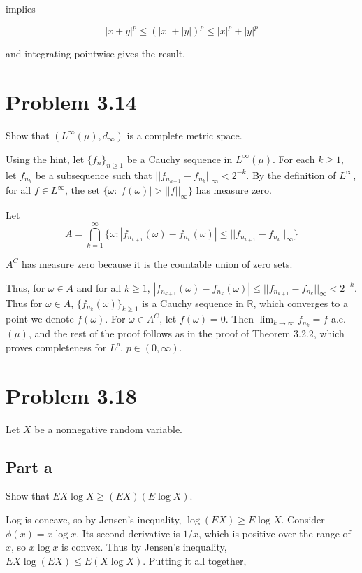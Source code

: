 \documentclass{article}
\newcommand{\R}{\mathbb{R}}
\begin{document}
implies

\[
|x+y|^p \leq (|x|+|y|)^p \leq |x|^p + |y|^p
\]

and integrating pointwise gives the result.

\section*{Problem 3.14}

Show that $(L^\infty(\mu), d_\infty)$ is a complete metric space.

Using the hint, let $\{f_n\}_{n \geq 1}$ be a Cauchy sequence in $L^\infty(\mu)$. For each $k \geq 1$, let $f_{n_k}$ be a subsequence such that $||f_{n_{k+1}} - f_{n_k}||_\infty < 2^{-k}$. By the definition of $L^\infty$, for all $f \in L^\infty$, the set $\{\omega: |f(\omega)| > ||f||_\infty\}$ has measure zero.

Let
\[
A = \bigcap_{k=1}^\infty\{ \omega: |f_{n_{k+1}}(\omega) - f_{n_k}(\omega)| \leq ||f_{n_{k+1}} - f_{n_k}||_\infty \}
\]

$A^C$ has measure zero because it is the countable union of zero sets.

Thus, for $\omega \in A$ and for all $k \geq 1$, $|f_{n_{k+1}}(\omega) - f_{n_k}(\omega)| \leq ||f_{n_{k+1}} - f_{n_k}||_\infty < 2^{-k}$. Thus for $\omega \in A$, $\{f_{n_k}(\omega)\}_{k \geq 1}$ is a Cauchy sequence in $\R$, which converges to a point we denote $f(\omega)$. For $\omega \in A^C$, let $f(\omega) = 0$. Then $\lim_{k \rightarrow \infty} f_{n_k} = f$ a.e. $(\mu)$, and the rest of the proof follows as in the proof of Theorem 3.2.2, which proves completeness for $L^p$, $p \in (0, \infty)$.

\section*{Problem 3.18}

Let $X$ be a nonnegative random variable.

\subsection*{Part a}

Show that $EX \log X \geq (EX)(E\log X)$.

Log is concave, so by Jensen's inequality, $\log (EX) \geq E \log X$. Consider $\phi(x) = x \log x$. Its second derivative is $1/x$, which is positive over the range of $x$, so $x \log x$ is convex. Thus by Jensen's inequality, $E X \log (EX) \leq E (X \log X)$. Putting it all together,
\end{document}
